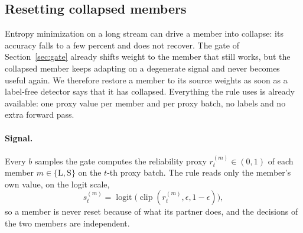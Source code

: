 \subsection{Resetting collapsed members}\label{sec:reset}

Entropy minimization on a long stream can drive a member into collapse: its accuracy falls to a few percent and does not recover.
The gate of Section~\ref{sec:gate} already shifts weight to the member that still works, but the collapsed member keeps adapting on a degenerate
signal and never becomes useful again. We therefore restore a member to its source weights as soon as a label-free detector says that it has collapsed.
Everything the rule uses is already available: one proxy value per member and per proxy batch, no labels and no extra forward pass.

\paragraph{Signal.}
Every $b$ samples the gate computes the reliability proxy $r_t^{(m)} \in (0,1)$ of each member $m \in \{\mathrm{L},\mathrm{S}\}$ on the $t$-th proxy batch.
The rule reads only the member's own value, on the logit scale,
\begin{equation}
  s_t^{(m)} = \operatorname{logit}\!\big(\operatorname{clip}(r_t^{(m)}, \epsilon, 1-\epsilon)\big),
\end{equation}
so a member is never reset because of what its partner does, and the decisions of the two members are independent.

